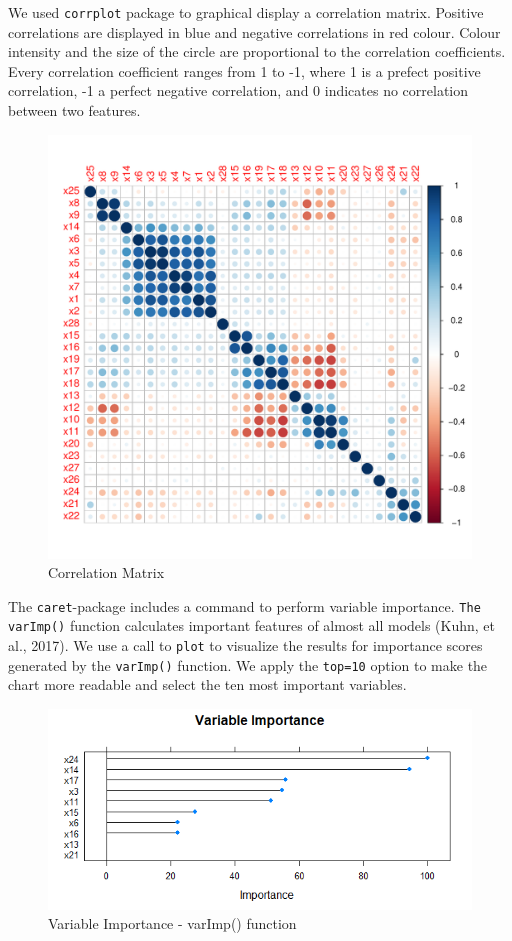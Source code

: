 \documentclass{article}
\begin{document}
We used \texttt{corrplot} package to graphical display a correlation matrix. Positive correlations are displayed in blue and negative correlations in red colour. Colour intensity and the size of the circle are proportional to the correlation coefficients. Every correlation coefficient ranges from 1 to -1, where 1 is a prefect positive correlation, -1 a perfect negative correlation, and 0 indicates no correlation between two features.

\begin{figure}[h]
\caption{Correlation Matrix }
\centering
\includegraphics[scale=0.6]{../CART/CorrPlot.pdf}
\end{figure}

The \texttt{caret}-package includes a command to perform variable importance. \texttt{The varImp()} function calculates important features of almost all models (Kuhn, et al., 2017). We use a call to \texttt{plot} to visualize the results for importance scores generated by the \texttt{varImp()} function. We apply the \texttt{top=10} option to make the chart more readable and select the ten most important variables.
\newpage
\begin{figure}
\caption{Variable Importance - varImp() function}
\includegraphics[scale=0.9]{../CART/VarImp_top_10.png}
\end{figure}
\end{document}
